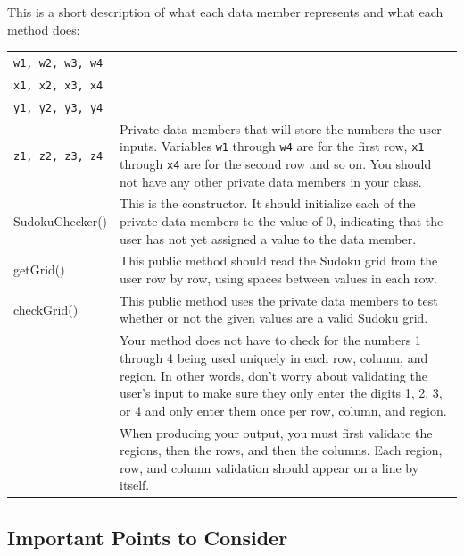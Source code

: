 \vspace*{.05in}
\noindent This is a short description of what each data member represents and what each method does:\\

\begin{tabular}{|l|p{10cm}|}
\hline
{\tt w1, w2, w3, w4} &  \\
{\tt x1, x2, x3, x4} & \\
{\tt y1, y2, y3, y4} & \\
{\tt z1, z2, z3, z4}    &  Private data members that will store the numbers the user inputs.  Variables {\tt w1} through {\tt w4}
are for the first row, {\tt x1} through {\tt x4} are for the second row
and so on. You should not have any other private data members in your class.\\
\hline
SudokuChecker() &This is the constructor.  It should initialize each of the private data members to the value of 0, indicating
that the user has not yet assigned a value to the data member. \\
\hline

getGrid()   & This public method should read the Sudoku grid from the user row by row, using spaces between values in each row.\\
\hline
checkGrid() &   This public method uses the private data members to test whether or not the given values are a valid Sudoku grid.\\
& Your method does not have to check for the numbers 1 through 4 being used uniquely in each row, column, and region.
In other words, don't worry about validating the user's input to make sure they only enter the digits 1, 2, 3, or 4 and only
enter them once per row, column, and region. \\
& When producing your output, you must first validate the regions, then the rows, and then the columns.  Each region,
row, and column validation should appear on a line by itself. \\
\hline
\end{tabular}

\vspace{-0.05in}
\subsection*{Important Points to Consider}
\vspace{-0.05in}

